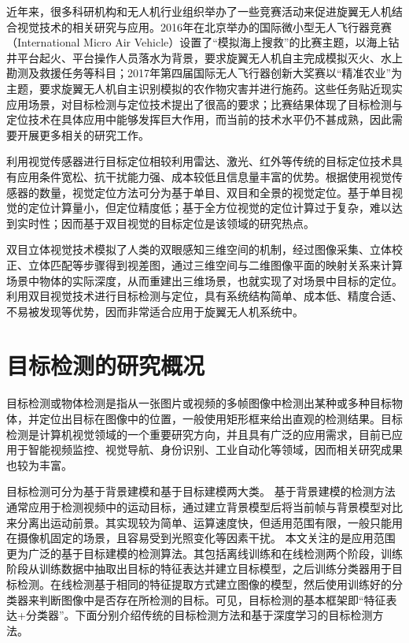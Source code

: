 近年来，很多科研机构和无人机行业组织举办了一些竞赛活动来促进旋翼无人机结合视觉技术的相关研究与应用。2016年在北京举办的国际微小型无人飞行器竞赛（International Micro Air Vehicle）设置了“模拟海上搜救”的比赛主题，以海上钻井平台起火、平台操作人员落水为背景，要求旋翼无人机自主完成模拟灭火、水上勘测及救援任务等科目；2017年第四届国际无人飞行器创新大奖赛以“精准农业”为主题，要求旋翼无人机自主识别模拟的农作物灾害并进行施药。这些任务贴近现实应用场景，对目标检测与定位技术提出了很高的要求；比赛结果体现了目标检测与定位技术在具体应用中能够发挥巨大作用，而当前的技术水平仍不甚成熟，因此需要开展更多相关的研究工作。

利用视觉传感器进行目标定位相较利用雷达、激光、红外等传统的目标定位技术具有应用条件宽松、抗干扰能力强、成本较低且信息量丰富的优势。根据使用视觉传感器的数量，视觉定位方法可分为基于单目、双目和全景的视觉定位\cite{赵霞2016}。基于单目视觉的定位计算量小，但定位精度低；基于全方位视觉的定位计算过于复杂，难以达到实时性；因而基于双目视觉的目标定位是该领域的研究热点。

双目立体视觉技术模拟了人类的双眼感知三维空间的机制，经过图像采集、立体校正、立体匹配等步骤得到视差图，通过三维空间与二维图像平面的映射关系来计算场景中物体的实际深度，从而重建出三维场景，也就实现了对场景中目标的定位\cite{苏东2014}。利用双目视觉技术进行目标检测与定位，具有系统结构简单、成本低、精度合适、不易被发现等优势，因而非常适合应用于旋翼无人机系统中。



\section{目标检测的研究概况}
目标检测或物体检测是指从一张图片或视频的多帧图像中检测出某种或多种目标物体，并定位出目标在图像中的位置，一般使用矩形框来给出直观的检测结果。目标检测是计算机视觉领域的一个重要研究方向，并且具有广泛的应用需求，目前已应用于智能视频监控、视觉导航、身份识别、工业自动化等领域，因而相关研究成果也较为丰富。

目标检测可分为基于背景建模和基于目标建模两大类\cite{尹宏鹏2016}。
基于背景建模的检测方法通常应用于检测视频中的运动目标，通过建立背景模型后将当前帧与背景模型对比来分离出运动前景。其实现较为简单、运算速度快，但适用范围有限，一般只能用在摄像机固定的场景，且容易受到光照变化等因素干扰。
本文关注的是应用范围更为广泛的基于目标建模的检测算法。其包括离线训练和在线检测两个阶段，训练阶段从训练数据中抽取出目标的特征表达并建立目标模型，之后训练分类器用于目标检测。在线检测基于相同的特征提取方式建立图像的模型，然后使用训练好的分类器来判断图像中是否存在所检测的目标。可见，目标检测的基本框架即“特征表达+分类器”。下面分别介绍传统的目标检测方法和基于深度学习的目标检测方法。


